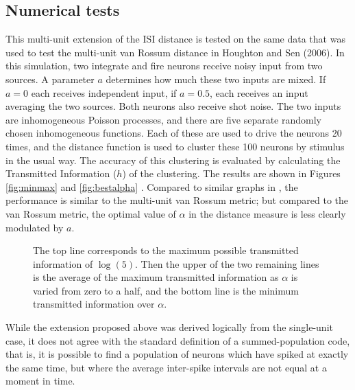\subsection{Numerical tests}
This multi-unit extension of the ISI distance is tested on the same data that was used to test the multi-unit van Rossum distance in Houghton and Sen (2006).   In this simulation, two integrate and fire neurons receive noisy input from two sources.  A parameter $a$ determines how much these two inputs are mixed.  If $a=0$ each receives independent input, if $a=0.5$, each receives an input averaging the two sources.  Both neurons also receive shot noise.  The two inputs are inhomogeneous Poisson processes, and there are five separate randomly chosen inhomogeneous functions. Each of these are used to drive the neurons 20 times, and the distance function is used to cluster these 100 neurons by stimulus in the usual way.  The accuracy of this clustering is evaluated by calculating the Transmitted Information ($h$) of the clustering.  The results are shown in Figures \ref{fig:minmax} and \ref{fig:bestalpha} . Compared to similar graphs in \cite{HoughtonSen2008}, the performance is similar to the multi-unit van Rossum metric; but compared to the van Rossum metric, the optimal value of $\alpha$ in the distance measure is less clearly modulated by $a$.  

\begin{figure}[htb]

\caption{\label{mmav}The top line corresponds to the maximum possible transmitted information of $\log(5)$.  Then the upper of the two remaining lines is the average of the maximum transmitted information as $\alpha$ is varied from zero to a half, and the bottom line is the minimum transmitted information over $\alpha$.}
\end{figure}

%
%

While the extension proposed above was derived logically from the single-unit case, it does not agree with the standard definition of a summed-population code, that is, it is possible to find a population of neurons which have spiked at exactly the same time, but where the average inter-spike intervals are not equal at a moment in time.

